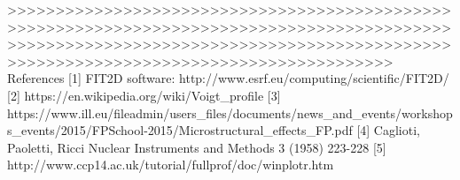 >>>>>>>>>>>>>>>>>>>>>>>>>>>>>>>>>>>>>>>>>>>>>>>>>>>>>>>>>>>>>>>>>>>>>>>>>>>>>>>>>>>>>>>>>>>>>>>>>>>>>>>>>>>>>>>>>>>>>>>>>>>>>>>>>>>>>>>>>>>>>>>>>>>>>>>>>>>>>>>>>>>>>>>>>>>>>>>>>>
References
[1] FIT2D software: http://www.esrf.eu/computing/scientific/FIT2D/
[2] https://en.wikipedia.org/wiki/Voigt_profile
[3] https://www.ill.eu/fileadmin/users_files/documents/news_and_events/workshops_events/2015/FPSchool-2015/Microstructural_effects_FP.pdf
[4] Caglioti, Paoletti, Ricci Nuclear Instruments and Methods 3 (1958) 223-228
[5] http://www.ccp14.ac.uk/tutorial/fullprof/doc/winplotr.htm
